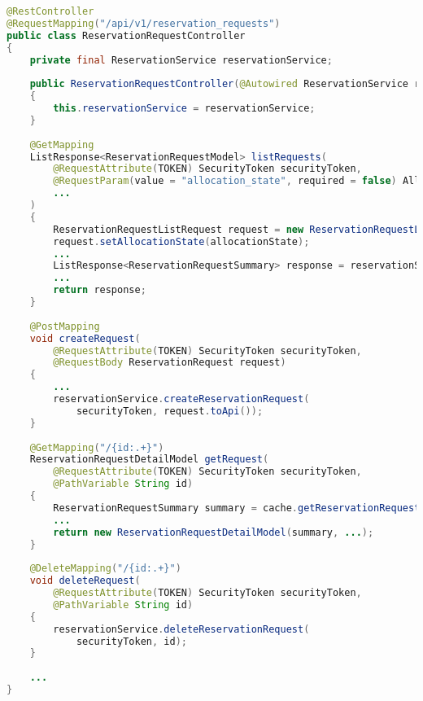\begin{lstlisting}[language=java, caption=ReservationRequestController.java, label=lst:controller]
@RestController
@RequestMapping("/api/v1/reservation_requests")
public class ReservationRequestController
{
    private final ReservationService reservationService;
    
    public ReservationRequestController(@Autowired ReservationService reservationService)
    {
        this.reservationService = reservationService;
    }
    
    @GetMapping
    ListResponse<ReservationRequestModel> listRequests(
        @RequestAttribute(TOKEN) SecurityToken securityToken,
        @RequestParam(value = "allocation_state", required = false) AllocationState allocationState,
        ...
    )
    {
        ReservationRequestListRequest request = new ReservationRequestListRequest();
        request.setAllocationState(allocationState);
        ...
        ListResponse<ReservationRequestSummary> response = reservationService.listReservationRequests(request);
        ...
        return response;
    }
    
    @PostMapping
    void createRequest(
        @RequestAttribute(TOKEN) SecurityToken securityToken,
        @RequestBody ReservationRequest request)
    {
        ...
        reservationService.createReservationRequest(
            securityToken, request.toApi());
    }
    
    @GetMapping("/{id:.+}")
    ReservationRequestDetailModel getRequest(
        @RequestAttribute(TOKEN) SecurityToken securityToken,
        @PathVariable String id)
    {
        ReservationRequestSummary summary = cache.getReservationRequestSummary(securityToken, id);
        ...
        return new ReservationRequestDetailModel(summary, ...);
    }
    
    @DeleteMapping("/{id:.+}")
    void deleteRequest(
        @RequestAttribute(TOKEN) SecurityToken securityToken,
        @PathVariable String id)
    {
        reservationService.deleteReservationRequest(
            securityToken, id);
    }
    
    ...
}
\end{lstlisting}